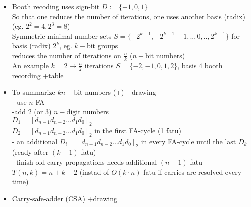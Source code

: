 \documentclass[a4paper, 11pt]{report}
\theoremstyle{break}
\theoremstyle{proofstyle}
\begin{document}
\begin{itemize}
\begin{itemize}
            \item Booth recoding uses sign-bit $D:=\{-1,0,1\}$ \\
            So that one reduces the number of iterations, one uses another basis (radix) (eg. $2^2=4, 2^3=8$) \\
            
            Symmetric minimal number-sets $S=\{-2^{k-1}, -2^{k-1}+1, .., 0, .., 2^{k-1}\}$ for basis (radix) $2^k$, eg. $k-$bit groups \\ 
            \to reduces the number of iterations on $\frac{n}{k}$ ($n-$bit numbers) \\
            An example $k=2\to \frac{n}{2}$ iterations $S=\{-2,-1,0,1,2\}$, basis $4$ booth recording +table \\
            
            \item To summarize $k n-$bit numbers (+) +drawing \\
            - use $n$ FA \\
            -add $2$ (or $3$) $n-$digit numbers\\
            $D_1=[d_{n-1}d_{n-2}...d_{1}d_{0}]_2$ \\
            $D_2=[d_{n-1}d_{n-2}...d_{1}d_{0}]_2$ in the first FA-cycle (1 fatu)\\ 
            - an additional $D_i=[d_{n-1}d_{n-2}...d_{1}d_{0}]_2$ in every FA-cycle until the last $D_k$ (ready after $(k-1)$ fatu) \\
            - finish old carry propagations needs additional $(n-1)$ fatu \\
            $T(n,k)=n+k-2$ (instad of $O(k\cdot n)$ fatu if carries are resolved every time) 
            
            \item Carry-safe-adder (CSA) +drawing 
        \end{itemize} 
        
        
        \end{itemize}
    
    
\end{document}
